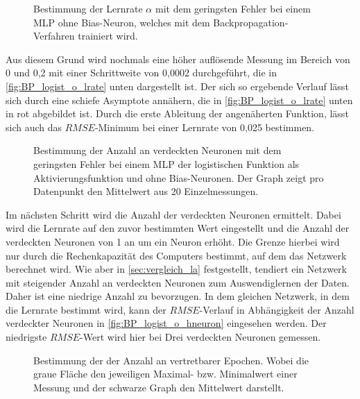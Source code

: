 \begin{figure}[!htb]
    \centering
        
    \caption[Beispiel zur Bestimmung der Lernrate $\alpha$]{Bestimmung der Lernrate $\alpha$ mit dem geringsten Fehler bei einem MLP ohne Bias-Neuron, welches mit dem Backpropagation-Verfahren trainiert wird.  }
    \label{fig:BP_logist_o_lrate}
\end{figure}

Aus diesem Grund wird nochmals eine höher auflösende Messung im Bereich von 0 und 0,2 mit einer Schrittweite von 0,0002 durchgeführt, die in \autoref{fig:BP_logist_o_lrate} unten dargestellt ist. Der sich so ergebende Verlauf lässt sich durch eine schiefe Asymptote annähern, die in \autoref{fig:BP_logist_o_lrate} unten in rot abgebildet ist. Durch die erste Ableitung der angenäherten Funktion, lässt sich auch das $RMSE$-Minimum bei einer Lernrate von 0,025 bestimmen.\\


\begin{figure}[!htb]
    \centering
        
    \caption[Beispiel zur Bestimmung der Anzahl verdeckter Neuronen beim BP]{Bestimmung der Anzahl an verdeckten Neuronen mit dem geringsten Fehler bei einem MLP der logistischen Funktion als Aktivierungsfunktion und ohne Bias-Neuronen. Der Graph zeigt pro Datenpunkt den Mittelwert aus 20 Einzelmessungen.}
    \label{fig:BP_logist_o_hneuron}
\end{figure}

Im nächsten Schritt wird die Anzahl der verdeckten Neuronen ermittelt. Dabei wird die Lernrate auf den zuvor bestimmten Wert eingestellt und die Anzahl der verdeckten Neuronen von 1 an um ein Neuron erhöht. Die Grenze hierbei wird nur durch die Rechenkapazität des Computers bestimmt, auf dem das Netzwerk berechnet wird. Wie aber in \autoref{sec:vergleich_la} festgestellt, tendiert ein Netzwerk mit steigender Anzahl an verdeckten Neuronen zum Auswendiglernen der Daten. Daher ist eine niedrige Anzahl zu bevorzugen. In dem gleichen Netzwerk, in dem die Lernrate bestimmt wird, kann der $RMSE$-Verlauf in Abhängigkeit der Anzahl verdeckter Neuronen in \autoref{fig:BP_logist_o_hneuron} eingesehen werden. Der niedrigste $RMSE$-Wert wird hier bei Drei verdeckten Neuronen gemessen.\\ 

\begin{figure}[!htb]
    \centering
        
    \caption[Beispiel zur Bestimmung der Anzahl an Epochen]{Bestimmung der der Anzahl an vertretbarer Epochen. Wobei die graue Fläche den jeweiligen Maximal- bzw. Minimalwert einer Messung und der schwarze Graph den Mittelwert darstellt.}
    \label{fig:BP_logis_o_epochen}
\end{figure}

